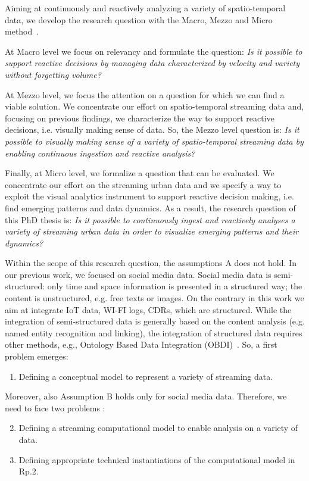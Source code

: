 \sloppy
Aiming at continuously and reactively analyzing a variety of spatio-temporal data, we develop the research question with the Macro, Mezzo and Micro method~\cite{lacasse2015making}.

At Macro level we focus on relevancy and formulate the question: \textit{Is it possible to support reactive decisions by managing data characterized by velocity and variety without forgetting volume?}

At Mezzo level, we focus the attention on a question for which we can find a viable solution. We concentrate our effort on spatio-temporal streaming data and, focusing on previous findings, we characterize the way to support reactive decisions, i.e. visually making sense of data. So, the Mezzo level question is: \textit{Is it possible to visually making sense of a variety of spatio-temporal streaming data by enabling continuous ingestion and reactive analysis?}

Finally, at Micro level, we formalize a question that can be evaluated. We concentrate our effort on the streaming urban data and we specify a way to exploit the visual analytics instrument to support reactive decision making, i.e. find emerging patterns and data dynamics. As a result, the research question of this PhD thesis is: \textit{Is it possible to continuously ingest and reactively analyses a variety of streaming urban data in order to visualize emerging patterns and their dynamics?}

Within the scope of this research question, the  assumptions A does not hold. In our previous work, we focused on social media data. Social media data is semi-structured: only time and space information is presented in a structured way; the content is unstructured, e.g. free texts or images.
On the contrary in this work we aim at integrate IoT data, WI-FI logs, CDRs, which are structured.
While the integration of semi-structured data is generally based on the content analysis (e.g. named entity recognition and linking), the integration of structured data requires other methods, e.g., Ontology Based Data Integration (OBDI)~\cite{LenzeriniOBDI}.
So, a first problem emerges:
\begin{enumerate}[leftmargin=32pt,label=\textsf{Rp.\arabic*}]
\item Defining a conceptual model to represent a variety of streaming data.
\end{enumerate}

Moreover, also Assumption B holds only for social media data. Therefore, we need to face two problems :
\begin{enumerate}[leftmargin=32pt,label=\textsf{Rp.\arabic*}]
\setcounter{enumi}{1}
\item Defining a streaming computational model to enable analysis on a variety of data.
\item Defining appropriate technical instantiations of the computational model in \textsf{Rp.2}.
\end{enumerate}

